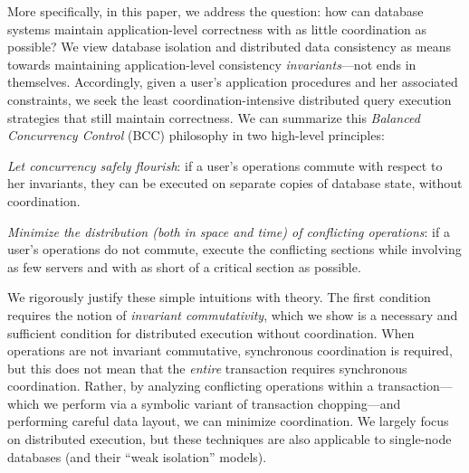 More specifically, in this paper, we address the question: how can
database systems maintain application-level correctness with as little
coordination as possible? We view database isolation and distributed
data consistency as means towards maintaining application-level
consistency \textit{invariants}---not ends in themselves. Accordingly,
given a user's application procedures and her associated constraints,
we seek the least coordination-intensive distributed query execution
strategies that still maintain correctness. We can summarize this
\textit{Balanced Concurrency Control} (BCC) philosophy in two
high-level principles:
\begin{introenumerate}
\item \textit{Let concurrency safely flourish}: if a user's operations
  commute with respect to her invariants, they can be executed on
  separate copies of database state, without coordination.
\item \textit{Minimize the distribution (both in space and time) of
  conflicting operations}: if a user's operations do not commute,
  execute the conflicting sections while involving as few servers and
  with as short of a critical section as possible.
\end{introenumerate}
We rigorously justify these simple intuitions with theory. The first
condition requires the notion of \textit{invariant commutativity},
which we show is a necessary and sufficient condition for distributed
execution without coordination. When operations are not invariant
commutative, synchronous coordination is required, but this does not
mean that the \textit{entire} transaction requires synchronous
coordination. Rather, by analyzing conflicting operations within a
transaction---which we perform via a symbolic variant of transaction
chopping---and performing careful data layout, we can minimize
coordination. We largely focus on distributed execution, but these
techniques are also applicable to single-node databases (and their
``weak isolation'' models).

